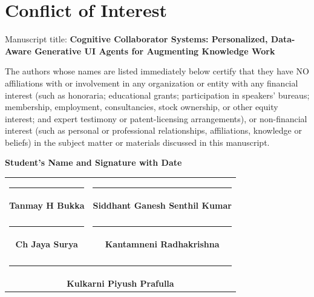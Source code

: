 \documentclass[12pt, a4paper]{report}
\begin{document}
\newpage
\chapter*{Conflict of Interest}

Manuscript title: \textbf{Cognitive Collaborator Systems: Personalized, Data-Aware Generative UI Agents for Augmenting Knowledge Work}

The authors whose names are listed immediately below certify that they have NO affiliations with or involvement in any organization or entity with any financial interest (such as honoraria; educational grants; participation in speakers’ bureaus; membership, employment, consultancies, stock ownership, or other equity interest; and expert testimony or patent-licensing arrangements), or non-financial interest (such as personal or professional relationships, affiliations, knowledge or beliefs) in the subject matter or materials discussed in this manuscript.

\vspace{0.8cm}
\noindent \textbf{Student’s Name and Signature with Date}


\vspace{0.5cm}
\begin{table}[H]
    \centering
    \scriptsize
    \begin{tabular}{cc}
    \rule{6cm}{1pt} & \rule{6cm}{1pt} \\
    \textbf{Tanmay H Bukka} & \textbf{Siddhant Ganesh Senthil Kumar} \\
    \vspace{0.8cm} & \vspace{0.8cm} \\
    \rule{6cm}{1pt} & \rule{6cm}{1pt} \\
    \textbf{Ch Jaya Surya} & \textbf{Kantamneni Radhakrishna} \\
    \vspace{0.8cm} & \vspace{0.8cm} \\
    \multicolumn{2}{c}{\rule{6cm}{1pt}} \\
    \multicolumn{2}{c}{\textbf{Kulkarni Piyush Prafulla}} \\
    \end{tabular}
\end{table}
\end{document}
